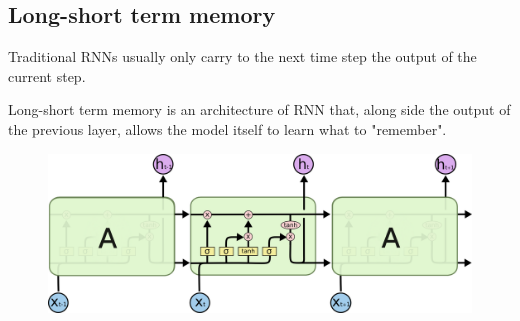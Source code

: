 \subsection{Long-short term memory}

Traditional RNNs usually only carry to the next time step the output of the current step.

Long-short term memory is an architecture of RNN that, along side the output of the previous layer, allows the model itself to learn what to "remember".

\begin{figure}[H]
    \centering
    \includegraphics[width=0.6\linewidth]{./img/lstm.png}
\end{figure}


